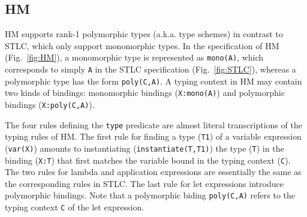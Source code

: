 \documentclass[runningheads,a4paper]{llncs}
\makeatletter
\def\squiggly{\bgroup \markoverwith{\textcolor{red}{\lower3.5\p@\hbox{\sixly \char58}}}\ULon}
\makeatother
\begin{document}
\subsection{HM}\label{ssec:HM}
HM supports rank-1 polymorphic types (a.k.a. type schemes)
in contrast to STLC, which only support monomorphic types.
In the specification of HM (Fig.~\ref{fig:HM}), a monomorphic type
is represented as \verb|mono(A)|, which corresponds to simply \verb|A|
in the STLC specification (Fig.~\ref{fig:STLC}), whereas a polymorphic type
has the form \verb|poly(C,A)|. A typing context in HM may contain
two kinds of bindings: monomorphic bindings (\verb|X:mono(A)|) and
polymorphic bindings (\verb|X:poly(C,A)|).

The four rules defining the \verb|type| predicate are almost literal
transcriptions of the typing rules of HM. The first rule for finding
a type (\verb|T1|) of a variable expression (\verb|var(X)|) amounts
to instantiating (\verb|instantiate(T,T1)|) the type (\verb|T|)
in the binding (\verb|X:T|) that first matches the variable
bound in the typing context (\verb|C|).
The two rules for lambda and application expressions are essentially
the same as the corresponding rules in STLC.
The last rule for let expressions introduce polymorphic bindings.
Note that a polymorphic biding \verb|poly(C,A)| refers to
the typing context \verb|C| of the let expression.
\end{document}
